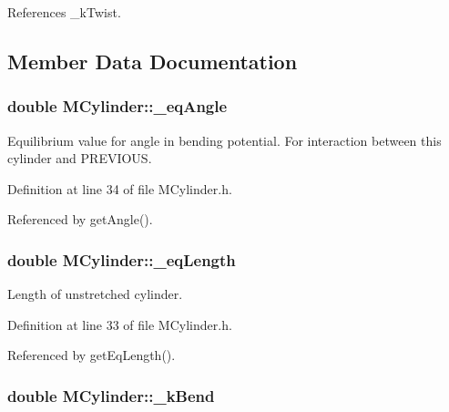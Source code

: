 References \+\_\+k\+Twist.



\subsection{Member Data Documentation}
\hypertarget{classMCylinder_aa542255d87485fa1e7bca2ef5b3b872f}{
\subsubsection[{\+\_\+eq\+Angle}]{\setlength{\rightskip}{0pt plus 5cm}double M\+Cylinder\+::\+\_\+eq\+Angle\hspace{0.3cm}{\ttfamily [private]}}}\label{classMCylinder_aa542255d87485fa1e7bca2ef5b3b872f}


Equilibrium value for angle in bending potential. For interaction between this cylinder and P\+R\+E\+V\+I\+O\+U\+S. 



Definition at line 34 of file M\+Cylinder.\+h.



Referenced by get\+Angle().

\hypertarget{classMCylinder_aa368a3a46725ee7e2b16a9786dc88ffe}{
\subsubsection[{\+\_\+eq\+Length}]{\setlength{\rightskip}{0pt plus 5cm}double M\+Cylinder\+::\+\_\+eq\+Length\hspace{0.3cm}{\ttfamily [private]}}}\label{classMCylinder_aa368a3a46725ee7e2b16a9786dc88ffe}


Length of unstretched cylinder. 



Definition at line 33 of file M\+Cylinder.\+h.



Referenced by get\+Eq\+Length().

\hypertarget{classMCylinder_a49de338cc5d2d74356cf8da395a5fe54}{
\subsubsection[{\+\_\+k\+Bend}]{\setlength{\rightskip}{0pt plus 5cm}double M\+Cylinder\+::\+\_\+k\+Bend\hspace{0.3cm}{\ttfamily [private]}}}\label{classMCylinder_a49de338cc5d2d74356cf8da395a5fe54}


